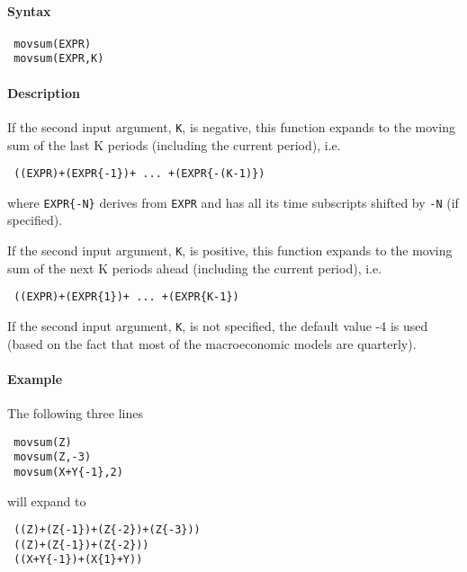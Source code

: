 


	\paragraph{Syntax}
 
 \begin{verbatim}
 movsum(EXPR)
 movsum(EXPR,K)
 \end{verbatim}
 
 \paragraph{Description}
 
 If the second input argument, \texttt{K}, is negative, this function
 expands to the moving sum of the last K periods (including the current
 period), i.e.
 
 \begin{verbatim}
 ((EXPR)+(EXPR{-1})+ ... +(EXPR{-(K-1)})
 \end{verbatim}
 
 where \texttt{EXPR\{-N\}} derives from \texttt{EXPR} and has all its
 time subscripts shifted by \texttt{-N} (if specified).
 
 If the second input argument, \texttt{K}, is positive, this function
 expands to the moving sum of the next K periods ahead (including the
 current period), i.e.
 
 \begin{verbatim}
 ((EXPR)+(EXPR{1})+ ... +(EXPR{K-1})
 \end{verbatim}
 
 If the second input argument, \texttt{K}, is not specified, the default
 value -4 is used (based on the fact that most of the macroeconomic
 models are quarterly).
 
 \paragraph{Example}
 
 The following three lines
 
 \begin{verbatim}
 movsum(Z)
 movsum(Z,-3)
 movsum(X+Y{-1},2)
 \end{verbatim}
 
 will expand to
 
 \begin{verbatim}
 ((Z)+(Z{-1})+(Z{-2})+(Z{-3}))
 ((Z)+(Z{-1})+(Z{-2}))
 ((X+Y{-1})+(X{1}+Y))
 \end{verbatim}


